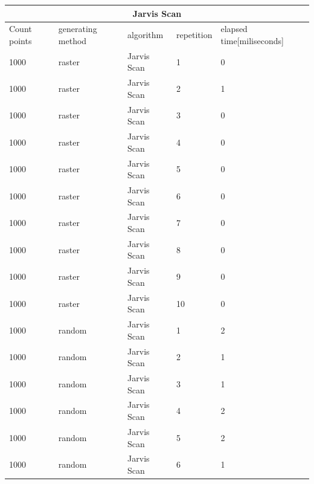 \documentclass[12pt]{article}
\begin{document}
\begin{longtable}{|l|l|l|l|l|}
\hline
\multicolumn{5}{|c|}{\textbf{Jarvis Scan}}                                                  \\ \hline
Count points & generating method & algorithm   & repetition & elapsed time{[}miliseconds{]} \\ \hline
1000         & raster            & Jarvis Scan & 1          & 0                             \\ \hline
1000         & raster            & Jarvis Scan & 2          & 1                             \\ \hline
1000         & raster            & Jarvis Scan & 3          & 0                             \\ \hline
1000         & raster            & Jarvis Scan & 4          & 0                             \\ \hline
1000         & raster            & Jarvis Scan & 5          & 0                             \\ \hline
1000         & raster            & Jarvis Scan & 6          & 0                             \\ \hline
1000         & raster            & Jarvis Scan & 7          & 0                             \\ \hline
1000         & raster            & Jarvis Scan & 8          & 0                             \\ \hline
1000         & raster            & Jarvis Scan & 9          & 0                             \\ \hline
1000         & raster            & Jarvis Scan & 10         & 0                             \\ \hline
1000         & random            & Jarvis Scan & 1          & 2                             \\ \hline
1000         & random            & Jarvis Scan & 2          & 1                             \\ \hline
1000         & random            & Jarvis Scan & 3          & 1                             \\ \hline
1000         & random            & Jarvis Scan & 4          & 2                             \\ \hline
1000         & random            & Jarvis Scan & 5          & 2                             \\ \hline
1000         & random            & Jarvis Scan & 6          & 1                             \\ \hline

\end{longtable}
\end{document}
